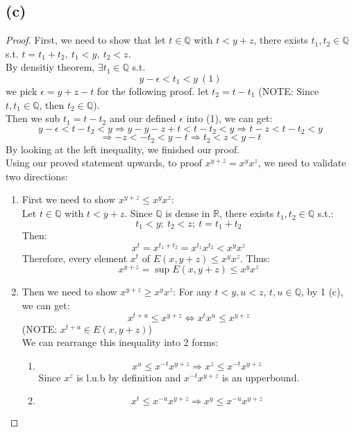 \documentclass{article}
\begin{document}
\subsection*{(c)}
\begin{proof}
    First, we need to show that let $t \in \mathbb{Q}$ with $t < y + z$, there exists $t_1, t_2 \in \mathbb{Q}$ s.t. $t = t_1 + t_2, \ t_1 < y, \ t_2 < z$.
    \\
    By densitiy theorem, $\exists t_1 \in \mathbb{Q}$ s.t.
    \[ y - \epsilon < t_1 < y \ (1) \] 
    we pick $\epsilon = y + z - t$ for the following proof.
    let $t_2 = t - t_1$ (NOTE: Since $t, t_1 \in \mathbb{Q}$, then $t_2 \in \mathbb{Q}$). 
    \\
    Then we sub $t_1 = t - t_2$ and our defined $\epsilon$ into (1), we can get:
    \[ y - \epsilon < t - t_2 < y \Rightarrow y - y - z + t < t - t_2 < y \Rightarrow t - z < t - t_2 < y \]
    \[ \Rightarrow -z < -t_2 < y - t \Rightarrow t_2 < z < y - t \]
    By looking at the left inequality, we finished our proof.
    \\
    Using our proved statement upwards, to proof $x^{y + z} = x^y x^z$, we need to validate two directions:
    \\
    \begin{enumerate}
        \item First we need to show $x^{y + z} \leq x^y x^z$:
        \\
        Let $t \in \mathbb{Q}$ with $t < y + z$.
        Since $\mathbb{Q}$ is dense in $\mathbb{R}$, there exists $t_1, t_2 \in \mathbb{Q}$ s.t.:
        \[ t_1 < y; \ t_2 < z; \ t = t_1 + t_2 \]
        Then:
        \[ x^t = x^{t_1 + t_2} = x^{t_1}x^{t_2} < x^yx^z \]
        Therefore, every element $x^t$ of $E(x, y + z) \leq x^yx^z$.
        Thus:
        \[ x^{y + z} = \sup E(x, y + z) \leq x^y x^z \]
        \item Then we need to show $x^{y + z} \geq x^y x^z$:
        For any $t < y, u < z$, $t,u \in \mathbb{Q}$, by 1 (c), we can get:
        \[ x^{t + u} \leq x^{y + z} \Leftrightarrow x^t x^u \leq x^{y + z} \]
        (NOTE: $x^{t + u} \in E(x, y + z)$)
        \\
        We can rearrange this inequality into 2 forms:
        \begin{enumerate}
            \item \[ x^u \leq x^{-t} x^{y + z} \Rightarrow x^z \leq x^{-t} x^{y + z} \]
            Since $x^z$ is l.u.b by definition and $x^{-t} x^{y + z}$ is an upperbound.
            \item \[ x^t \leq x^{-u} x^{y + z} \Rightarrow x^y \leq x^{-u} x^{y + z} \]

\end{enumerate}
\end{enumerate}
\end{proof}
\end{document}
